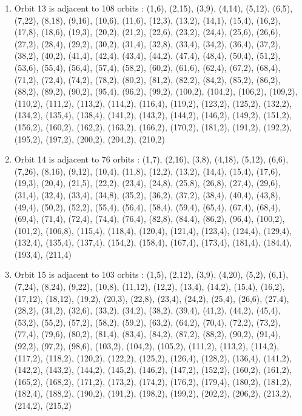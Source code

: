 \documentclass[12pt]{article}
\begin{document}
\begin{enumerate}
\item Orbit 13 is adjacent to 108 orbits : (1,6), (2,15), (3,9), (4,14), (5,12), (6,5), (7,22), (8,18), (9,16), (10,6), (11,6), (12,3), (13,2), (14,1), (15,4), (16,2), (17,8), (18,6), (19,3), (20,2), (21,2), (22,6), (23,2), (24,4), (25,6), (26,6), (27,2), (28,4), (29,2), (30,2), (31,4), (32,8), (33,4), (34,2), (36,4), (37,2), (38,2), (40,2), (41,4), (42,4), (43,4), (44,2), (47,4), (48,4), (50,4), (51,2), (53,6), (55,4), (56,4), (57,4), (58,2), (60,2), (61,6), (62,4), (67,2), (68,4), (71,2), (72,4), (74,2), (78,2), (80,2), (81,2), (82,2), (84,2), (85,2), (86,2), (88,2), (89,2), (90,2), (95,4), (96,2), (99,2), (100,2), (104,2), (106,2), (109,2), (110,2), (111,2), (113,2), (114,2), (116,4), (119,2), (123,2), (125,2), (132,2), (134,2), (135,4), (138,4), (141,2), (143,2), (144,2), (146,2), (149,2), (151,2), (156,2), (160,2), (162,2), (163,2), (166,2), (170,2), (181,2), (191,2), (192,2), (195,2), (197,2), (200,2), (204,2), (210,2)
\item Orbit 14 is adjacent to 76 orbits : (1,7), (2,16), (3,8), (4,18), (5,12), (6,6), (7,26), (8,16), (9,12), (10,4), (11,8), (12,2), (13,2), (14,4), (15,4), (17,6), (19,3), (20,4), (21,5), (22,2), (23,4), (24,8), (25,8), (26,8), (27,4), (29,6), (31,4), (32,4), (33,4), (34,8), (35,2), (36,2), (37,2), (38,4), (40,4), (43,8), (49,4), (50,2), (52,2), (55,4), (56,4), (58,4), (59,4), (65,4), (67,4), (68,4), (69,4), (71,4), (72,4), (74,4), (76,4), (82,8), (84,4), (86,2), (96,4), (100,2), (101,2), (106,8), (115,4), (118,4), (120,4), (121,4), (123,4), (124,4), (129,4), (132,4), (135,4), (137,4), (154,2), (158,4), (167,4), (173,4), (181,4), (184,4), (193,4), (211,4)
\item Orbit 15 is adjacent to 103 orbits : (1,5), (2,12), (3,9), (4,20), (5,2), (6,1), (7,24), (8,24), (9,22), (10,8), (11,12), (12,2), (13,4), (14,2), (15,4), (16,2), (17,12), (18,12), (19,2), (20,3), (22,8), (23,4), (24,2), (25,4), (26,6), (27,4), (28,2), (31,2), (32,6), (33,2), (34,2), (38,2), (39,4), (41,2), (44,2), (45,4), (53,2), (55,2), (57,2), (58,2), (59,2), (63,2), (64,2), (70,4), (72,2), (73,2), (77,4), (79,6), (80,2), (81,4), (83,4), (84,2), (87,2), (88,2), (90,2), (91,4), (92,2), (97,2), (98,6), (103,2), (104,2), (105,2), (111,2), (113,2), (114,2), (117,2), (118,2), (120,2), (122,2), (125,2), (126,4), (128,2), (136,4), (141,2), (142,2), (143,2), (144,2), (145,2), (146,2), (147,2), (152,2), (160,2), (161,2), (165,2), (168,2), (171,2), (173,2), (174,2), (176,2), (179,4), (180,2), (181,2), (182,4), (188,2), (190,2), (191,2), (198,2), (199,2), (202,2), (206,2), (213,2), (214,2), (215,2)

\end{enumerate}
\end{document}
